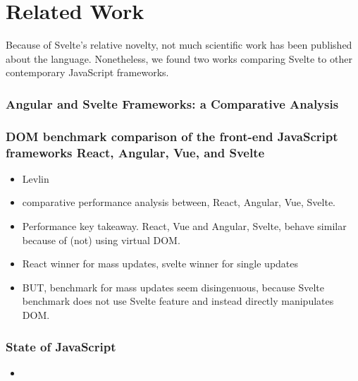 \chapter{Related Work}
\label{ch:related-work}

Because of Svelte's relative novelty, not much scientific work has been published about the language. Nonetheless, we found two works comparing Svelte to other contemporary JavaScript frameworks.

\subsection{Angular and Svelte Frameworks: a Comparative Analysis}

\subsection{DOM benchmark comparison of the front-end JavaScript frameworks React, Angular, Vue, and Svelte}

\begin{itemize}
    \item Levlin\cite{levlin_dom_2020}
    \item comparative performance analysis between, React, Angular, Vue, Svelte.
    \item Performance key takeaway. React, Vue and Angular, Svelte, behave similar because of (not) using virtual DOM.
    \item React winner for mass updates, svelte winner for single updates
    \item BUT, benchmark for mass updates seem disingenuous, because Svelte benchmark does not use Svelte feature and instead directly manipulates DOM. 
\end{itemize}

\subsection{State of JavaScript}

\begin{itemize}
    \item \cite{noauthor_state_nodate}
\end{itemize}